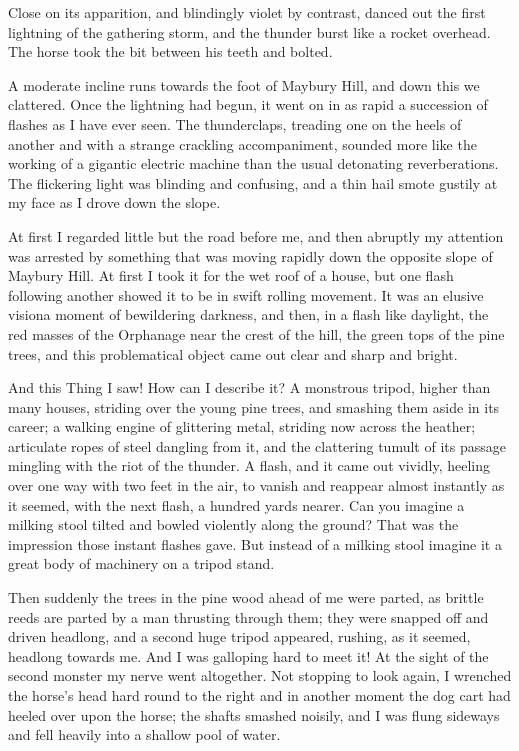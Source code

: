 Close on its apparition, and blindingly violet by contrast, danced
out the first lightning of the gathering storm, and the thunder
burst like a rocket overhead. The horse took the bit between his
teeth and bolted.

A moderate incline runs towards the foot of Maybury Hill, and down
this we clattered. Once the lightning had begun, it went on in as
rapid a succession of flashes as I have ever seen. The
thunderclaps, treading one on the heels of another and with a
strange crackling accompaniment, sounded more like the working of a
gigantic electric machine than the usual detonating reverberations.
The flickering light was blinding and confusing, and a thin hail
smote gustily at my face as I drove down the slope.

At first I regarded little but the road before me, and then
abruptly my attention was arrested by something that was moving
rapidly down the opposite slope of Maybury Hill. At first I took it
for the wet roof of a house, but one flash following another showed
it to be in swift rolling movement. It was an elusive vision\dash{}a
moment of bewildering darkness, and then, in a flash like daylight,
the red masses of the Orphanage near the crest of the hill, the
green tops of the pine trees, and this problematical object came
out clear and sharp and bright.

And this Thing I saw! How can I describe it? A monstrous tripod,
higher than many houses, striding over the young pine trees, and
smashing them aside in its career; a walking engine of glittering
metal, striding now across the heather; articulate ropes of steel
dangling from it, and the clattering tumult of its passage mingling
with the riot of the thunder. A flash, and it came out vividly,
heeling over one way with two feet in the air, to vanish and
reappear almost instantly as it seemed, with the next flash, a
hundred yards nearer. Can you imagine a milking stool tilted and
bowled violently along the ground? That was the impression those
instant flashes gave. But instead of a milking stool imagine it a
great body of machinery on a tripod stand.

Then suddenly the trees in the pine wood ahead of me were parted,
as brittle reeds are parted by a man thrusting through them; they
were snapped off and driven headlong, and a second huge tripod
appeared, rushing, as it seemed, headlong towards me. And I was
galloping hard to meet it! At the sight of the second monster my
nerve went altogether. Not stopping to look again, I wrenched the
horse's head hard round to the right and in another moment the dog
cart had heeled over upon the horse; the shafts smashed noisily,
and I was flung sideways and fell heavily into a shallow pool of
water.

